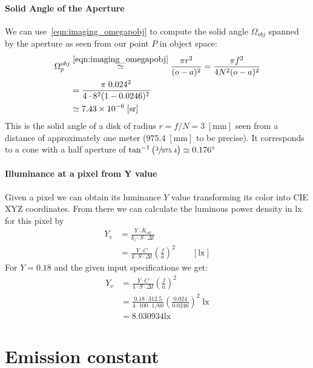 \paragraph{Solid Angle of the Aperture}
We can use~\cref{eqn:imaging_omegapobj} to compute the solid angle $\Omega_{obj}$ spanned by the 
aperture as seen from our point $P$ in object space:
\begin{align*}
\Omega_p^{obj} &\stackrel{\eqref{eqn:imaging_omegapobj}}{\simeq} \frac{\pi r^2}{(o-a)^2} 
  = \frac{\pi f^2}{4N^2(o-a)^2}\\
&= \frac{\pi\; 0.024^2}{4\cdot 8^2 (1-0.0246)^2}\\
&\simeq  \num{7.43}\times 10^{-6}\;[\unit{\steradian}]
\end{align*}
This is the solid angle of a disk of radius $r = f / N = 3\;[\unit{\milli\meter}]$ seen 
from a distance of approximately one meter ($975.4\;[\unit{\milli\meter}]$ to be precise). 
It corresponds to a cone with a half aperture of $\tan^{-1}\big(\sfrac{3}{975.4}\big)\simeq 0.176\degree$

\ifomit
\paragraph{Illuminance at a pixel from Y value}
Given a pixel we can obtain its luminance $Y$ value transforming its color into 
\gls{CIE} \gls{XYZ} coordinates. 
From there we can calculate the luminous power density in \unit{\lux} for this pixel by
\begin{align*}
Y_v &= \frac{Y\cdot K_{cd}}{ k_i\cdot S \cdot \Delta t} \\
&= \frac{Y\cdot C}{ 4\cdot S \cdot \Delta t} \left(\frac{f}{a}\right)^2
\qquad [\unit{\lux}]
\end{align*}
For $Y=0.18$ and the given input specifications we get:
\begin{align*}
Y_v &= \frac{Y\cdot C}{ 4\cdot S \cdot \Delta t} \left(\frac{f}{a}\right)^2 \\
&= \frac{0.18\cdot 312.5}{ 4\cdot 100 \cdot 1/60} \left(\frac{0.024}{0.0246}\right)^2 \;\unit{\lux} \\
&= \num{8.030934}\unit{\lux}
\end{align*}
\fi

\section{Emission constant}

